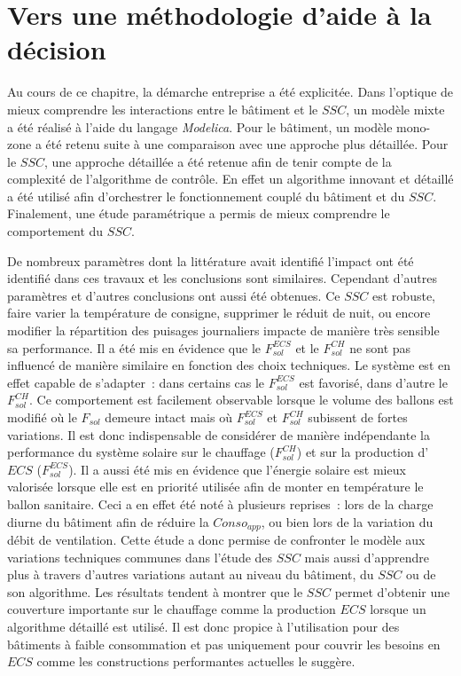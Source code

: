\section{Vers une méthodologie d’aide à la décision} %
\label{sec:vers_une_methodologie_d_aide_a_la_decision}
Au cours de ce chapitre, la démarche entreprise a été explicitée. Dans l’optique de mieux
comprendre les interactions entre le bâtiment et le $SSC$, un modèle mixte a été réalisé à
l’aide du langage \emph{Modelica}. Pour le bâtiment, un modèle mono-zone a été retenu
suite à une comparaison avec une approche plus détaillée. Pour le $SSC$, une approche
détaillée a été retenue afin de tenir compte de la complexité de l’algorithme de contrôle.
En effet un algorithme innovant et détaillé a été utilisé afin d’orchestrer le
fonctionnement couplé du bâtiment et du $SSC$. Finalement, une étude paramétrique a permis
de mieux comprendre le comportement du $SSC$.

De nombreux paramètres dont la littérature avait identifié l’impact ont été identifié dans
ces travaux et les conclusions sont similaires. Cependant d’autres paramètres et d’autres
conclusions ont aussi été obtenues. Ce $SSC$ est robuste, faire varier la température de
consigne, supprimer le réduit de nuit, ou encore modifier la répartition des puisages
journaliers impacte de manière très sensible sa performance. Il a été mis en évidence que
le $F_{sol}^{ECS}$ et le $F_{sol}^{CH}$ ne sont pas influencé de manière similaire en
fonction des choix techniques. Le système est en effet capable de s’adapter~: dans
certains cas le $F_{sol}^{ECS}$ est favorisé, dans d’autre le $F_{sol}^{CH}$. Ce
comportement est facilement observable lorsque le volume des ballons est modifié où le
$F_{sol}$ demeure intact mais où $F_{sol}^{ECS}$ et $F_{sol}^{CH}$ subissent de fortes
variations. Il est donc indispensable de considérer de manière indépendante la performance
du système solaire sur le chauffage ($F_{sol}^{CH}$) et sur la production d’$ECS$
($F_{sol}^{ECS}$). Il a aussi été mis en évidence que l’énergie solaire est mieux
valorisée lorsque elle est en priorité utilisée afin de monter en température le ballon
sanitaire. Ceci a en effet été noté à plusieurs reprises~: lors de la charge diurne du
bâtiment afin de réduire la $Conso_{app}$, ou bien lors de la variation du débit de
ventilation. Cette étude a donc permise de confronter le modèle aux variations techniques
communes dans l’étude des $SSC$ mais aussi d’apprendre plus à travers d’autres variations
autant au niveau du bâtiment, du $SSC$ ou de son algorithme. Les résultats tendent à
montrer que le $SSC$ permet d’obtenir une couverture importante sur le chauffage comme la
production $ECS$ lorsque un algorithme détaillé est utilisé. Il est donc propice à
l’utilisation pour des bâtiments à faible consommation et pas uniquement pour couvrir les
besoins en $ECS$ comme les constructions performantes actuelles le suggère.

